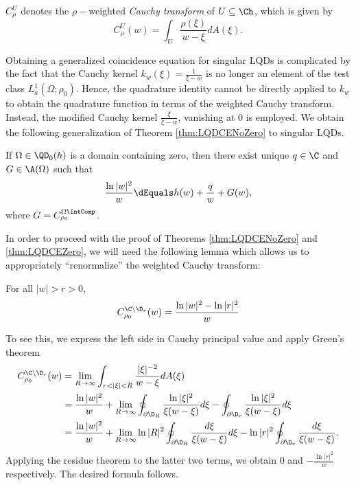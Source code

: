 \documentclass{article}
\numberwithin{equation}{section}
\begin{document}
$C_{\rho}^{U}$ denotes the $\rho-$weighted {\it Cauchy transform} of $U\subseteq\Ch$, which is given by
\begin{equation*}
C_\rho^{U}(w)=\int_{U}\dfrac{\rho(\xi)}{w-\xi}dA(\xi).
\end{equation*}

Obtaining a generalized coincidence equation for singular LQDs is complicated by the fact that the Cauchy kernel $k_w(\xi)=\frac{1}{\xi-w}$ is no longer an element of the test class $L_a^1(\Omega;\rho_0)$. Hence, the quadrature identity cannot be directly applied to $k_w$ to obtain the quadrature function in terms of the weighted Cauchy transform. Instead, the modified Cauchy kernel $\frac{\xi}{\xi-w}$, vanishing at $0$ is employed. We obtain the following generalization of Theorem \ref{thm:LQDCENoZero} to singular LQDs.
\begin{theorem}\label{thm:LQDCEZero}
    If $\Omega\in\QD_0(h)$ is a domain containing zero, then there exist unique $q\in\C$ and $G\in\A(\Omega)$ such that
    \begin{equation}\label{eqn:LQDCEZero}
        \dfrac{\ln|w|^2}{w}\dEquals h(w)+\dfrac{q}{w}+G(w),
    \end{equation}
    where $G=C_{\rho_0}^{\Omega\IntComp}$.
\end{theorem}


In order to proceed with the proof of Theorems \ref{thm:LQDCENoZero} and \ref{thm:LQDCEZero}, we will need the following lemma which allows us to appropriately ``renormalize'' the weighted Cauchy transform:
\begin{lemma}\label{lemma:LOGRenormCauchyTrans}
    For all $|w|>r>0$,
    \begin{equation}\label{eqn:LOGRenormCauchyTrans}
    C_{\rho_0}^{\C\setminus\D_r}(w)=\dfrac{\ln|w|^2-\ln|r|^2}{w}
\end{equation}
\end{lemma}
To see this, we express the left side in Cauchy principal value and apply Green's theorem
\begin{align*}
    C_{\rho_0}^{\C\setminus\D_r}(w)&=\lim_{R\to\infty}\int_{r<|\xi|<R}\dfrac{|\xi|^{-2}}{w-\xi}dA(\xi)\\
    &=\dfrac{\ln|w|^2}{w}+\lim_{R\to\infty}\oint_{\partial\D_R}\dfrac{\ln|\xi|^2}{\xi(w-\xi)}d\xi-\oint_{\partial\D_r}\dfrac{\ln|\xi|^2}{\xi(w-\xi)}d\xi\\
    &=\dfrac{\ln|w|^2}{w}+\lim_{R\to\infty}\ln|R|^2\oint_{\partial\D_R}\dfrac{d\xi}{\xi(w-\xi)}d\xi-\ln|r|^2\oint_{\partial\D_r}\dfrac{d\xi}{\xi(w-\xi)}.
\end{align*}
Applying the residue theorem to the latter two terms, we obtain $0$ and $-\frac{\ln|r|^2}{w}$ respectively. The desired formula follows.
\end{document}

